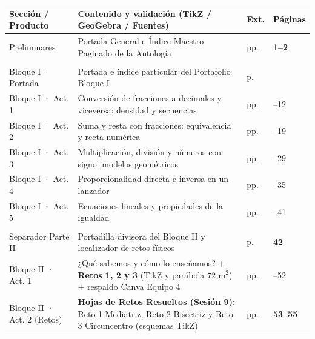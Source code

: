 \documentclass[spanish,letterpaper,oneside]{article}
\begin{document}
\renewcommand{\arraystretch}{1.10}
{\scriptsize
\noindent\begin{tabularx}{\textwidth}{|>{\raggedright\arraybackslash}p{}|>{\raggedright\arraybackslash}X|>{\centering\arraybackslash}p{}|>{\centering\arraybackslash}p{}|}
\hline
\rowcolor{iiiepeNavy}
\color{white}\textbf{Sección / Producto} &
\color{white}\textbf{Contenido y validación (TikZ / GeoGebra / Fuentes)} &
\color{white}\textbf{Ext.} &
\color{white}\textbf{Páginas} \\\hline
Preliminares & Portada General e Índice Maestro Paginado de la Antología & 2 pp. & \textbf{1--2} \\\hline
\rowcolor{iiiepeAqua!22}
\multicolumn{4}{|l|}{\textbf{\color{iiiepeNavy} PARTE I · PORTAFOLIO DE EVIDENCIAS DEL BLOQUE I (SESIONES 1--5)}} \\\hline
Bloque I · Portada & Portada e índice particular del Portafolio Bloque I & 1 p. & 3 \\\hline
\rowcolor{iiiepePale}
Bloque I · Act. 1 & Conversión de fracciones a decimales y viceversa: densidad y secuencias & 9 pp. & 4--12 \\\hline
Bloque I · Act. 2 & Suma y resta con fracciones: equivalencia y recta numérica & 7 pp. & 13--19 \\\hline
\rowcolor{iiiepePale}
Bloque I · Act. 3 & Multiplicación, división y números con signo: modelos geométricos & 10 pp. & 20--29 \\\hline
Bloque I · Act. 4 & Proporcionalidad directa e inversa en un lanzador & 6 pp. & 30--35 \\\hline
\rowcolor{iiiepePale}
Bloque I · Act. 5 & Ecuaciones lineales y propiedades de la igualdad & 6 pp. & 36--41 \\\hline
\rowcolor{iiiepeAqua!22}
\multicolumn{4}{|l|}{\textbf{\color{iiiepeNavy} PARTE II · BLOQUE II: ENSEÑAR DESDE EL DESAFÍO (SESIONES 8--13, RETOS Y PARCIAL 1)}} \\\hline
Separador Parte II & Portadilla divisora del Bloque II y localizador de retos físicos & 1 p. & \textbf{42} \\\hline
\rowcolor{iiiepePale}
Bloque II · Act. 1 & ¿Qué sabemos y cómo lo enseñamos? + \textbf{Retos 1, 2 y 3} (TikZ y parábola $72\text{ m}^2$) + respaldo Canva Equipo 4 & 10 pp. & 43--52 \\\hline
Bloque II · Act. 2 (Retos) & \textbf{Hojas de Retos Resueltos (Sesión 9):} Reto 1 Mediatriz, Reto 2 Bisectriz y Reto 3 Circuncentro (esquemas TikZ) & 3 pp. & \textbf{53--55} \\\hline

\end{tabularx}}
\end{document}
